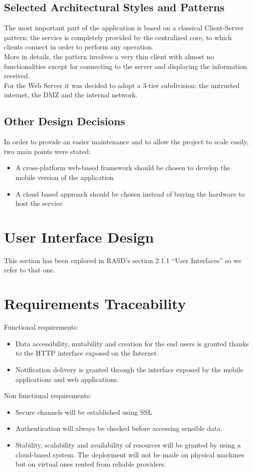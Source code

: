 \documentclass{article}
\begin{document}
\subsection{Selected Architectural Styles and Patterns}
The most important part of the application is based on a classical Client-Server pattern: the service is completely provided by the centralized core, to which clients connect in order to perform any operation.\\
More in details, the pattern involves a very thin client with almost no functionalities except for connecting to the server and displaying the information received.\\
For the Web Server it was decided to adopt a 3-tier subdivision: the untrusted internet, the DMZ and the internal network.
\subsection{Other Design Decisions}
In order to provide an easier maintenance and to allow the project to scale easily, two main points were stated: 
\begin{itemize}
	\item A cross-platform web-based framework should be chosen to develop the mobile version of the application 
	\item A cloud based approach should be chosen instead of buying the hardware to host the service
\end{itemize}

	\section{User Interface Design}
	This section has been explored in RASD's section 2.1.1 ``User Interfaces'' so we refer to that one.

	\section{Requirements Traceability}
	Functional requirements:
	\begin{itemize}
		\item Data accessibility, mutability and creation for the end users is granted thanks to the HTTP interface exposed on the Internet.
		\item Notification delivery is granted through the interface exposed by the mobile applications and web applications.
	\end{itemize}
	Non functional requirements:
	\begin{itemize}
		\item Secure channels will be established using SSL 
		\item Authentication will always be checked before accessing sensible data.
		\item Stability, scalability and availability of resources will be granted by using a cloud-based system. The deployment will not be made on physical machines but on virtual ones rented from reliable providers.
	\end{itemize}
\end{document}
